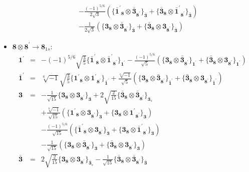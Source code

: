 \documentclass[english]{article}
\newcommand{\subcg}[3]{\big\{ {#1}\otimes{#2}\big\}^{}_{#3}}
\newcommand{\rep}[1]{\mathbf{#1}}
\begin{document}
\begin{itemize}
\begin{eqnarray*}
 & & -\frac{(-1)^{5/6}}{2 \sqrt{3}}\left(\subcg{\rep{\bar{1}^{\prime}}_{\rep{8}}}{\rep{\bar{3}}_{\rep{8^{\prime}}}}{\rep{\bar{3}}}+\subcg{\rep{\bar{3}}_{\rep{8}}}{\rep{\bar{1}^{\prime}}_{\rep{8^{\prime}}}}{\rep{\bar{3}}}\right) \\ 
 & & -\frac{1}{2 \sqrt{3}}\left(\subcg{\rep{3}_{\rep{8}}}{\rep{\bar{3}}_{\rep{8^{\prime}}}}{\rep{\bar{3}}}+\subcg{\rep{\bar{3}}_{\rep{8}}}{\rep{3}_{\rep{8^{\prime}}}}{\rep{\bar{3}}}\right)
\end{eqnarray*}
\item $\rep{8}\otimes\rep{8^{\prime}}\to\rep{8}_{1s}$:
\begin{eqnarray*}
\rep{1^{\prime}} &=& -(-1)^{5/6} \sqrt{\frac{3}{5}}\subcg{\rep{\bar{1}^{\prime}}_{\rep{8}}}{\rep{\bar{1}^{\prime}}_{\rep{8^{\prime}}}}{\rep{1^{\prime}}}-\frac{(-1)^{5/6}}{\sqrt{5}}\left(\subcg{\rep{3}_{\rep{8}}}{\rep{\bar{3}}_{\rep{8^{\prime}}}}{\rep{1^{\prime}}}+\subcg{\rep{\bar{3}}_{\rep{8}}}{\rep{3}_{\rep{8^{\prime}}}}{\rep{1^{\prime}}}\right)
\\
\rep{\bar{1}^{\prime}} &=& \sqrt[6]{-1} \sqrt{\frac{3}{5}}\subcg{\rep{1^{\prime}}_{\rep{8}}}{\rep{1^{\prime}}_{\rep{8^{\prime}}}}{\rep{\bar{1}^{\prime}}}+\frac{\sqrt[6]{-1}}{\sqrt{5}}\left(\subcg{\rep{3}_{\rep{8}}}{\rep{\bar{3}}_{\rep{8^{\prime}}}}{\rep{\bar{1}^{\prime}}}+\subcg{\rep{\bar{3}}_{\rep{8}}}{\rep{3}_{\rep{8^{\prime}}}}{\rep{\bar{1}^{\prime}}}\right)
\\
\rep{3} &=& -\frac{1}{\sqrt{15}}\subcg{\rep{3}_{\rep{8}}}{\rep{3}_{\rep{8^{\prime}}}}{\rep{3}}+2 \sqrt{\frac{2}{15}}\subcg{\rep{\bar{3}}_{\rep{8}}}{\rep{\bar{3}}_{\rep{8^{\prime}}}}{\rep{3}_{s}} \\ 
 & & +\frac{\sqrt[6]{-1}}{\sqrt{15}}\left(\subcg{\rep{1^{\prime}}_{\rep{8}}}{\rep{3}_{\rep{8^{\prime}}}}{\rep{3}}+\subcg{\rep{3}_{\rep{8}}}{\rep{1^{\prime}}_{\rep{8^{\prime}}}}{\rep{3}}\right) \\ 
 & & -\frac{(-1)^{5/6}}{\sqrt{15}}\left(\subcg{\rep{\bar{1}^{\prime}}_{\rep{8}}}{\rep{3}_{\rep{8^{\prime}}}}{\rep{3}}+\subcg{\rep{3}_{\rep{8}}}{\rep{\bar{1}^{\prime}}_{\rep{8^{\prime}}}}{\rep{3}}\right) \\ 
 & & -\frac{1}{\sqrt{15}}\left(\subcg{\rep{3}_{\rep{8}}}{\rep{\bar{3}}_{\rep{8^{\prime}}}}{\rep{3}}+\subcg{\rep{\bar{3}}_{\rep{8}}}{\rep{3}_{\rep{8^{\prime}}}}{\rep{3}}\right)
\\
\rep{\bar{3}} &=& 2 \sqrt{\frac{2}{15}}\subcg{\rep{3}_{\rep{8}}}{\rep{3}_{\rep{8^{\prime}}}}{\rep{\bar{3}}_{s}}-\frac{1}{\sqrt{15}}\subcg{\rep{\bar{3}}_{\rep{8}}}{\rep{\bar{3}}_{\rep{8^{\prime}}}}{\rep{\bar{3}}} \\ 

\end{eqnarray*}
\end{itemize}
\end{document}
